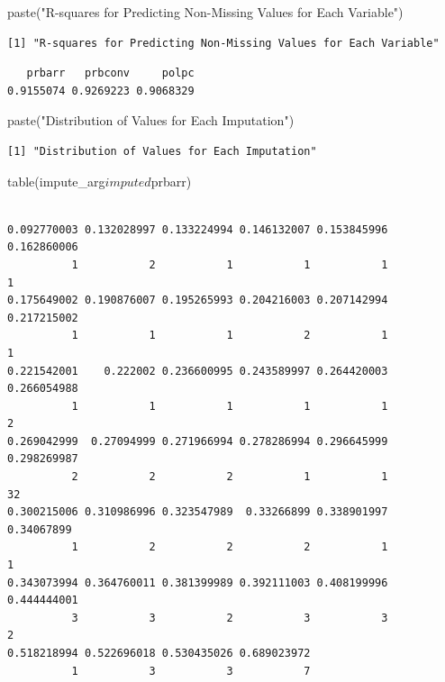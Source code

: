 \documentclass[]{article}
\newenvironment{Shaded}{}{}
\newcommand{\KeywordTok}[1]{\textcolor[rgb]{0.00,0.00,1.00}{#1}}
\newcommand{\NormalTok}[1]{#1}
\newcommand{\OperatorTok}[1]{#1}
\newcommand{\StringTok}[1]{\textcolor[rgb]{0.00,0.50,0.50}{#1}}
\begin{document}
\begin{Shaded}
\begin{Highlighting}[]
\KeywordTok{paste}\NormalTok{(}\StringTok{"R-squares for Predicting Non-Missing Values for Each Variable"}\NormalTok{)}
\end{Highlighting}
\end{Shaded}

\begin{verbatim}
[1] "R-squares for Predicting Non-Missing Values for Each Variable"
\end{verbatim}

\begin{Shaded}
\end{Shaded}

\begin{verbatim}
   prbarr   prbconv     polpc 
0.9155074 0.9269223 0.9068329 
\end{verbatim}

\begin{Shaded}
\begin{Highlighting}[]
\KeywordTok{paste}\NormalTok{(}\StringTok{"Distribution of Values for Each Imputation"}\NormalTok{)}
\end{Highlighting}
\end{Shaded}

\begin{verbatim}
[1] "Distribution of Values for Each Imputation"
\end{verbatim}

\begin{Shaded}
\begin{Highlighting}[]
\KeywordTok{table}\NormalTok{(impute_arg}\OperatorTok{$}\NormalTok{imputed}\OperatorTok{$}\NormalTok{prbarr)}
\end{Highlighting}
\end{Shaded}

\begin{verbatim}

0.092770003 0.132028997 0.133224994 0.146132007 0.153845996 0.162860006 
          1           2           1           1           1           1 
0.175649002 0.190876007 0.195265993 0.204216003 0.207142994 0.217215002 
          1           1           1           2           1           1 
0.221542001    0.222002 0.236600995 0.243589997 0.264420003 0.266054988 
          1           1           1           1           1           2 
0.269042999  0.27094999 0.271966994 0.278286994 0.296645999 0.298269987 
          2           2           2           1           1          32 
0.300215006 0.310986996 0.323547989  0.33266899 0.338901997  0.34067899 
          1           2           2           2           1           1 
0.343073994 0.364760011 0.381399989 0.392111003 0.408199996 0.444444001 
          3           3           2           3           3           2 
0.518218994 0.522696018 0.530435026 0.689023972 
          1           3           3           7 
\end{verbatim}
\end{document}

